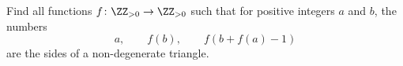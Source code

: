 Find all functions $f \colon \ZZ_{>0} \to \ZZ_{>0}$
such that for positive integers $a$ and $b$, the numbers
\[ a, \qquad f(b), \qquad f(b+f(a)-1) \]
are the sides of a non-degenerate triangle.